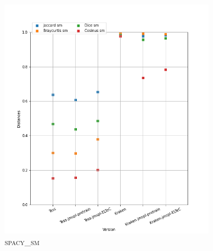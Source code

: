 \begin{figure}[H]
\begin{minipage}{6cm}
\begin{subfigure}{0.89\textwidth}
  \label{fig: }
  \end{subfigure}
  \end{minipage}
  \begin{minipage}{6cm}
  \begin{subfigure}{0.89\textwidth}
  \includegraphics[width=.89\textwidth]{IMAGES/ELTeC_DISTANCES_spaCy3.5.1/REYNOLDS-The-Mysteries-of-London-graph-dist-spaCy3.5.1-sm.png} 
  \caption{\textsc{spacy\_sm}}
  \label{fig:}
  \end{subfigure}
    \end{minipage}
  \begin{minipage}{6cm}
  \begin{subfigure}{0.89\textwidth}

\end{subfigure}
\end{minipage}
\end{figure}
